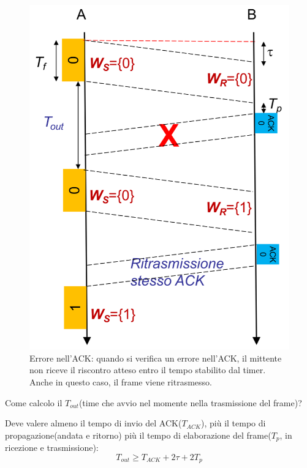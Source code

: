 \begin{figure}[htbp]
\begin{minipage}{0.48\textwidth}
    \end{minipage}%
    \hfill
    \begin{minipage}{0.48\textwidth}
        \includegraphics[width=\linewidth]{images/erroreack.png}
        \caption{Errore nell'ACK: quando si verifica un errore nell'ACK, il mittente non riceve il riscontro atteso entro il tempo stabilito dal timer. 
        Anche in questo caso, il frame viene ritrasmesso. }
    \end{minipage}
\end{figure}

Come calcolo il $T_{out}$(time che avvio nel momente nella trasmissione del frame)?

Deve valere almeno il tempo di invio del ACK($T_{ACK}$), più il tempo di propagazione(andata e ritorno) più il tempo di elaborazione del frame($T_p$, in ricezione e trasmissione):
\begin{equation}
T_{out} \geq T_{ACK} + 2\tau + 2T_p
\end{equation}

